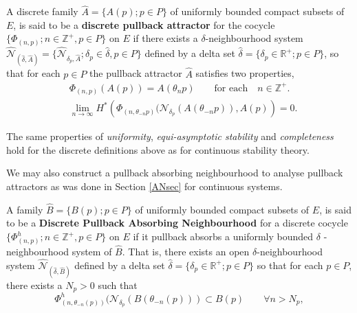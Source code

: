 \begin{defn} \label{DPAdef}
   A discrete family $\hat{A} = \{A(p);p \in P\}$ of
   uniformly bounded compact subsets of $E$, is said to be a {\bf
   discrete pullback attractor} for the cocycle $\{\Phi_{(n, p)}; n \in
   \mathbb{Z}^{+}, p \in P\}$ on $E$ if there exists a
   $\delta$-neighbourhood system $\hat{\mathcal{N}}_{(\hat{\delta}
   ,\hat{A})} = \{\hat{\mathcal{N}}_{\delta_p, \hat{A}}; \delta_p \in
   \hat{\delta}, p \in P \}$ defined by a delta set $\hat{\delta} =
   \{\delta_p \in \mathbb{R}^+; p \in P\}$, so that for each $p
   \in P$ the pullback attractor $\hat{A}$ satisfies two
   properties,
   \begin{align}
      & \Phi_{(n,p)} \left( A(p) \right) = A(\theta_n p) \qquad
                \text{for each} \quad n \in \mathbb{Z}^{+}. \\
      & \lim_{n \to \infty} H^{*} \left(\Phi_{(n, \theta_{-n}p)}
           (\mathcal{N}_{\delta_{p}}(A(\theta_{-n}p)), A(p)
           \right) = 0.
   \end{align}
\end{defn}

The same properties of {\em uniformity}, {\em equi-asymptotic stability} and
{\em completeness} hold for the discrete definitions above as for continuous
stability theory.

We may also construct a pullback absorbing neighbourhood to analyse pullback
attractors as was done in Section \ref{ANsec} for continuous systems.

\begin{defn} \label{dPANdef}
   A family $\hat{B}=\{B(p);p \in P\}$ of uniformly bounded compact subsets
   of $E$, is said to be a {\bf Discrete Pullback Absorbing Neighbourhood} for a
   discrete cocycle $\{\Phi^h_{(n,p)}; n \in \mathbb{Z}^{+},p \in P\}$ on $E$
   if it pullback absorbs a uniformly bounded $\delta$ -
   neighbourhood system of $\hat{B}$. That is, there exists an open
   $\delta$-neighbourhood system
   $\hat{\mathcal{N}}_{(\hat{\delta},\hat{B})}$ defined by a delta set
   $\hat{\delta} = \{\delta_p \in \mathbb{R}^+; p\in P\}$ so that for each
   $p \in P$, there exists a $N_p>0$ such that
  \begin{equation}
     \Phi^h_{(n,\theta_{-n}(p))}(\mathcal{N}_{\delta_p}(B(\theta_{-n}(p)))
     \subset B(p) \qquad \forall n > N_p,
   \end{equation}
\end{defn}

